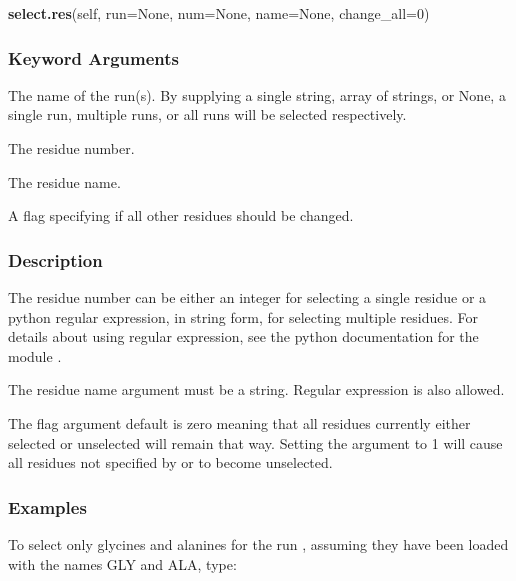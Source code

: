  \textsf{\textbf{select.res}(self, run=None, num=None, name=None, change\_all=0)} 

  
 \subsubsection{Keyword Arguments} 

   The name of the run(s).  By supplying a single string, array of strings, or None, a single run, multiple runs, or all runs will be selected respectively.   

   The residue number.   

   The residue name.   

   A flag specifying if all other residues should be changed.  

  

  
 \subsubsection{Description} 

 The residue number can be either an integer for selecting a single residue or a python regular expression, in string form, for selecting multiple residues.  For details about using regular expression, see the python documentation for the module . 
  

 The residue name argument must be a string.  Regular expression is also allowed. 
  

 The  flag argument default is zero meaning that all residues currently either selected or unselected will remain that way.  Setting the argument to 1 will cause all residues not specified by  or  to become unselected. 
  

  
 \subsubsection{Examples} 

 To select only glycines and alanines for the run , assuming they have been loaded with the names GLY and ALA, type: 
  



